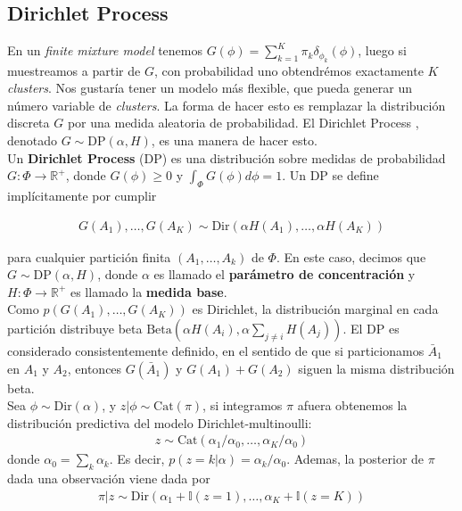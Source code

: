\subsection{Dirichlet Process}
\label{sec:dp}

En un \textit{finite mixture model} tenemos $G(\phi) = \sum_{k=1}^{K} \pi_{k}\delta_{\phi_{k}}(\phi)$, luego si muestreamos a partir de $G$, con probabilidad uno obtendrémos exactamente $K$ \textit{clusters}. Nos gustaría tener un modelo más flexible, que pueda generar un número variable de \textit{clusters}. La forma de hacer esto es remplazar la distribución discreta $G$ por una medida aleatoria de probabilidad. El Dirichlet Process \citep{ferguson1973bayesian}, denotado $G\sim \text{DP}(\alpha, H)$, es una manera de hacer esto.\\

Un \textbf{Dirichlet Process} (DP) es una distribución sobre medidas de probabilidad $G: \Phi \rightarrow \mathbb{R}^{+}$, donde $G(\phi)\geq 0$ y $\int_{\Phi}G(\phi)d\phi=1$. Un DP se define implícitamente por cumplir 

\begin{align}
    G(A_{1}), \ldots, G(A_{K}) \sim \text{Dir}(\alpha H(A_{1}), \ldots, \alpha H(A_{K}))
\end{align}

para cualquier partición finita $(A_{1}, \ldots, A_{k})$ de $\Phi$. En este caso, decimos que $G\sim \text{DP}(\alpha, H)$, donde $\alpha$ es llamado el \textbf{parámetro de concentración} y $H: \Phi \rightarrow \mathbb{R}^{+}$ es llamado la \textbf{medida base}.\\

Como $p(G(A_{1}), \ldots, G(A_{K}))$ es Dirichlet, la distribución marginal en cada partición distribuye beta $\text{Beta}(\alpha H(A_{i}), \alpha \sum_{j\neq i}H(A_{j}))$. El DP es considerado consistentemente definido, en el sentido de que si particionamos $\bar{A}_{1}$ en $A_{1}$ y $A_{2}$, entonces $G(\bar{A}_{1})$ y $G(A_{1})+G(A_{2})$ siguen la misma distribución beta. \\

Sea $\phi \sim \text{Dir}(\alpha)$, y $z|\phi  \sim \text{Cat}(\pi)$, si integramos $\pi$ afuera obtenemos la distribución predictiva del modelo Dirichlet-multinoulli:
\begin{align}
    z\sim \text{Cat}(\alpha_{1}/\alpha_{0}, \ldots, \alpha_{K}/\alpha_{0})
\end{align}
donde $\alpha_{0} = \sum_{k}\alpha_{k}$. Es decir, $p(z=k|\alpha)=\alpha_{k}/\alpha_{0}$. Ademas, la posterior de $\pi$ dada una observación viene dada por
\begin{align}
    \pi|z \sim \text{Dir}(\alpha_{1}+\mathbb{I}(z=1), \ldots, \alpha_{K}+\mathbb{I}(z=K))
\end{align}

